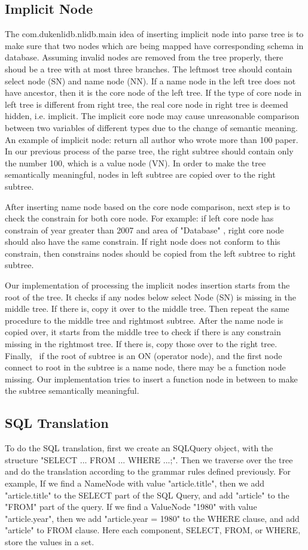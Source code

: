 \documentclass[twocolumn]{article}
\begin{document}
\subsection{Implicit Node}
The com.dukenlidb.nlidb.main idea of inserting implicit node into parse tree is to make sure that two nodes which are being mapped have corresponding schema in database. Assuming invalid nodes are removed from the tree properly, there shoud be a tree with at most three branches. The leftmost tree should contain select node (SN) and name node (NN). If a name node in the left tree does not have ancestor, then it is the core node of the left tree. If the type of core node in left tree is different from right tree, the real core node in right tree is deemed hidden, i.e. implicit. The implicit core node may cause unreasonable comparison between two variables of different types due to the change of semantic meaning. An example of implicit node: return all author who wrote more than 100 paper. In our previous process of the parse tree, the right subtree should contain only the number 100, which is a value node (VN). In order to make the tree semantically meaningful, nodes in left subtree are copied over to the right subtree.

After inserting name node based on the core node comparison, next step is to check the constrain for both core node. For example: if left core node has constrain of year greater than 2007 and area of "Database" , right core node should also have the same constrain. If right node does not conform to this constrain, then constrains nodes should be copied from the left subtree to right subtree. 

Our implementation of processing the implicit nodes insertion starts from the root of the tree. It checks if any nodes below select Node (SN) is missing in the middle tree. If there is, copy it over to the middle tree. Then repeat the same procedure to the middle tree and rightmost subtree. After the name node is copied over, it starts from the middle tree to check if there is any constrain missing in the rightmost tree. If there is, copy those over to the right tree. Finally,  if the root of subtree is an ON (operator node), and the first node connect to root in the subtree is a name node, there may be a function node missing. Our implementation tries to insert a function node in between to make the subtree semantically meaningful. 

\subsection{SQL Translation}
To do the SQL translation, first we create an SQLQuery object, with the structure "SELECT ... FROM ... WHERE ...;". Then we traverse over the tree and do the translation according to the grammar rules defined previously. For example, If we find a NameNode with value "article.title", then we add "article.title" to the SELECT part of the SQL Query, and add "article" to the "FROM" part of the query. If we find a ValueNode "1980" with value "article.year", then we add "article.year = 1980" to the WHERE clause, and add "article" to FROM clause. Here each component, SELECT, FROM, or WHERE, store the values in a set.
\end{document}
